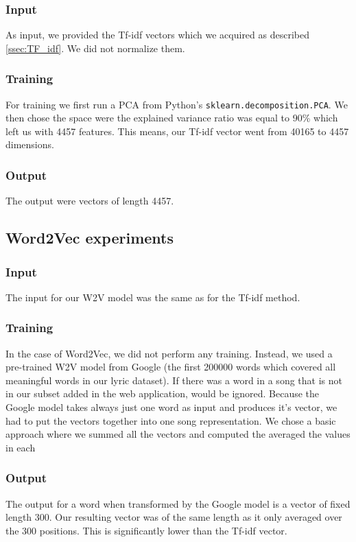 \subsubsection{Input}
As input, we provided the Tf-idf vectors which we acquired as described \ref{ssec:TF_idf}. We did not normalize them.

\subsubsection{Training}
For training we first run a PCA from Python's \texttt{sklearn.decomposition.PCA}. We then chose the space were the explained variance ratio was equal to 90\% which left us with 4457 features. This means, our Tf-idf vector went from 40165 to 4457 dimensions. 

\subsubsection{Output}
The output were vectors of length 4457.

\subsection{Word2Vec experiments}\label{ssec:w2v_experiments}

\subsubsection{Input}
The input for our W2V model was the same as for the Tf-idf method.

\subsubsection{Training}
In the case of Word2Vec, we did not perform any training. Instead, we used a pre-trained W2V model from Google  (the first 200000 words which covered all meaningful words in our lyric dataset). If there was a word in a song that is not in our subset added in the web application, would be ignored. Because the Google model takes always just one word as input and produces it's vector, we had to put the vectors together into one song representation. We chose a basic approach where we summed all the vectors and computed the averaged the values in each 

\subsubsection{Output}
The output for a word when transformed by the Google model is a vector of fixed length 300. Our resulting vector was of the same length as it only averaged over the 300 positions. This is significantly lower than the Tf-idf vector.

